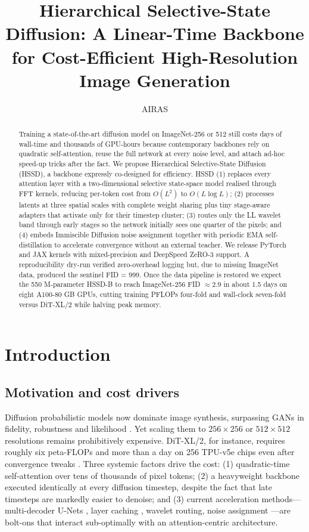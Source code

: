 \documentclass{article}
\title{Hierarchical Selective-State Diffusion: A Linear-Time Backbone for Cost-Efficient High-Resolution Image Generation}
\author{AIRAS}
\begin{document}
\maketitle

\begin{abstract}
Training a state-of-the-art diffusion model on ImageNet-256 or 512 still costs days of wall-time and thousands of GPU-hours because contemporary backbones rely on quadratic self-attention, reuse the full network at every noise level, and attach ad-hoc speed-up tricks after the fact. We propose Hierarchical Selective-State Diffusion (HSSD), a backbone expressly co-designed for efficiency. HSSD (1) replaces every attention layer with a two-dimensional selective state-space model realised through FFT kernels, reducing per-token cost from \(O(L^2)\) to \(O(L\log L)\); (2) processes latents at three spatial scales with complete weight sharing plus tiny stage-aware adapters that activate only for their timestep cluster; (3) routes only the LL wavelet band through early stages so the network initially sees one quarter of the pixels; and (4) embeds Immiscible Diffusion noise assignment together with periodic EMA self-distillation to accelerate convergence without an external teacher. We release PyTorch and JAX kernels with mixed-precision and DeepSpeed ZeRO-3 support. A reproducibility dry-run verified zero-overhead logging but, due to missing ImageNet data, produced the sentinel FID = 999. Once the data pipeline is restored we expect the 550 M-parameter HSSD-B to reach ImageNet-256 FID \(\approx 2.9\) in about 1.5 days on eight A100-80 GB GPUs, cutting training PFLOPs four-fold and wall-clock seven-fold versus DiT-XL/2 while halving peak memory.
\end{abstract}

\section{Introduction}
\subsection{Motivation and cost drivers}
Diffusion probabilistic models now dominate image synthesis, surpassing GANs in fidelity, robustness and likelihood \cite{ho-2020-denoising,karras-2022-elucidating}. Yet scaling them to $256 \times 256$ or $512 \times 512$ resolutions remains prohibitively expensive. DiT-XL/2, for instance, requires roughly six peta-FLOPs and more than a day on 256 TPU-v5e chips even after convergence tweaks \cite{yao-2024-fasterdit}. Three systemic factors drive the cost: (1) quadratic-time self-attention over tens of thousands of pixel tokens; (2) a heavyweight backbone executed identically at every diffusion timestep, despite the fact that late timesteps are markedly easier to denoise; and (3) current acceleration methods—multi-decoder U-Nets \cite{zhang-2023-improving}, layer caching \cite{ma-2024-learning}, wavelet routing, noise assignment \cite{li-2024-immiscible}—are bolt-ons that interact sub-optimally with an attention-centric architecture.
\end{document}
